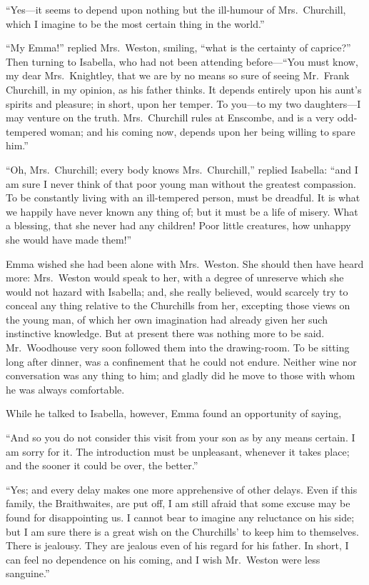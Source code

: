 ``Yes---it seems to depend upon nothing but the ill-humour
of Mrs.\ Churchill, which I imagine to be the most certain
thing in the world.''

``My Emma!'' replied Mrs.\ Weston, smiling, ``what is the certainty
of caprice?''  Then turning to Isabella, who had not been
attending before---``You must know, my dear Mrs.\ Knightley,
that we are by no means so sure of seeing Mr.\ Frank Churchill,
in my opinion, as his father thinks.  It depends entirely upon
his aunt's spirits and pleasure; in short, upon her temper.
To you---to my two daughters---I may venture on the truth.
Mrs.\ Churchill rules at Enscombe, and is a very odd-tempered woman;
and his coming now, depends upon her being willing to spare him.''

``Oh, Mrs.\ Churchill; every body knows Mrs.\ Churchill,''
replied Isabella:  ``and I am sure I never think of that poor young
man without the greatest compassion.  To be constantly living
with an ill-tempered person, must be dreadful.  It is what we
happily have never known any thing of; but it must be a life
of misery.  What a blessing, that she never had any children!
Poor little creatures, how unhappy she would have made them!''

Emma wished she had been alone with Mrs.\ Weston.  She should then have
heard more:  Mrs.\ Weston would speak to her, with a degree of unreserve
which she would not hazard with Isabella; and, she really believed,
would scarcely try to conceal any thing relative to the Churchills
from her, excepting those views on the young man, of which her own
imagination had already given her such instinctive knowledge.
But at present there was nothing more to be said.  Mr.\ Woodhouse
very soon followed them into the drawing-room. To be sitting
long after dinner, was a confinement that he could not endure.
Neither wine nor conversation was any thing to him; and gladly did
he move to those with whom he was always comfortable.

While he talked to Isabella, however, Emma found an opportunity
of saying,

``And so you do not consider this visit from your son as by any
means certain.  I am sorry for it.  The introduction must be unpleasant,
whenever it takes place; and the sooner it could be over, the better.''

``Yes; and every delay makes one more apprehensive of other delays.
Even if this family, the Braithwaites, are put off, I am still
afraid that some excuse may be found for disappointing us.
I cannot bear to imagine any reluctance on his side; but I am sure
there is a great wish on the Churchills' to keep him to themselves.
There is jealousy.  They are jealous even of his regard for his father.
In short, I can feel no dependence on his coming, and I wish Mr.\ Weston
were less sanguine.''

